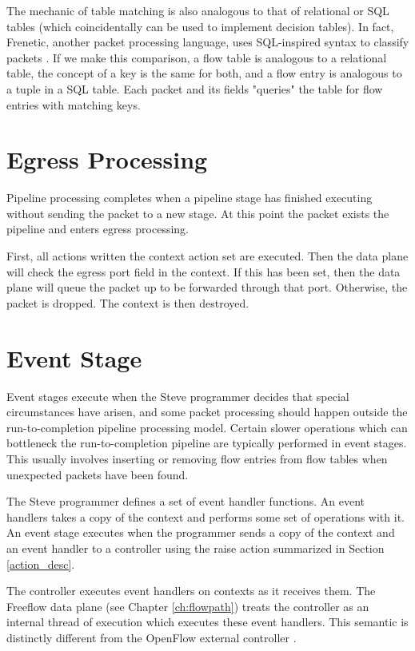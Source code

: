 The mechanic of table matching is also analogous to that of relational or SQL tables (which coincidentally can be used to implement decision tables).
In fact, Frenetic, another packet processing language, uses SQL-inspired syntax
to classify packets \cite{foster2011frenetic, foster2013frenetic}. If we make this
comparison, a flow table is analogous to a relational table, the concept of a
key is the same for both, and a flow entry is analogous to a tuple in a SQL
table. Each packet and its fields "queries" the table for flow entries with
matching keys.

\section{Egress Processing} \label{egress_desc}

Pipeline processing completes when a pipeline stage has finished executing without sending the packet to a new stage. At this point the packet exists the pipeline and enters egress processing.

First, all actions written the context action set are executed. Then the data plane will check the egress port field in the context. If this has been set, then the data plane will queue the packet up to be forwarded through that port. Otherwise, the packet is dropped. The context is then destroyed.

\section{Event Stage} \label{events_desc}

Event stages execute when the Steve programmer decides that special circumstances have arisen, and some packet processing should happen outside the run-to-completion pipeline processing model. Certain slower operations which can bottleneck the run-to-completion pipeline are typically performed in event stages. This usually involves inserting or removing flow entries from flow tables when unexpected packets have been found.

The Steve programmer defines a set of event handler functions. An event handlers takes a copy of the context and performs some set of operations with it. An event stage executes when the programmer sends a copy of the context and an event handler to a controller using the raise action summarized in Section \ref{action_desc}.

The controller executes event handlers on contexts as it receives them. The Freeflow data plane (see Chapter \ref{ch:flowpath}) treats the controller as an internal thread of execution which executes these event handlers. This semantic is distinctly different from the OpenFlow external controller \cite{openflow_spec}.

